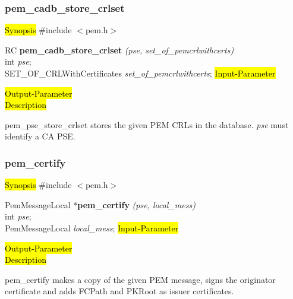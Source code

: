  

\subsubsection{pem\_cadb\_store\_crlset}
\label{pem_cadb_store_crlset}
\hl{Synopsis}
\#include $<$pem.h$>$ 

RC {\bf pem\_cadb\_store\_crlset} {\em (pse, set\_of\_pemcrlwithcerts)} \\
int {\em pse};\\
SET\_OF\_CRLWithCertificates {\em *set\_of\_pemcrlwithcerts};
\hl{Input-Parameter}

\hl{Output-Parameter}
 \\
\hl{Description}

pem\_pse\_store\_crlset stores the given PEM CRLs in the
database. {\em pse} must identify a CA PSE.







\subsubsection{pem\_certify}
\label{pem_certify}
\hl{Synopsis}
\#include $<$pem.h$>$ 

PemMessageLocal *{\bf pem\_certify} {\em (pse, local\_mess)} \\
int {\em pse};\\
PemMessageLocal {\em *local\_mess};
\hl{Input-Parameter}

\hl{Output-Parameter}
 \\
\hl{Description}

pem\_certify makes a copy of the given PEM message,
signs the originator certificate and adds FCPath and PKRoot as
issuer certificates.













